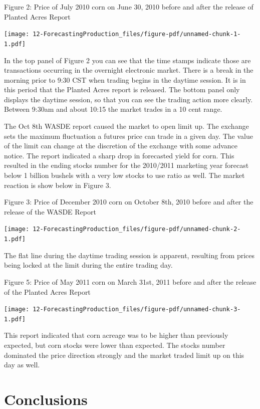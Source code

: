 \documentclass[
  letterpaper,
  DIV=11,
  numbers=noendperiod]{scrreprt}
\begin{document}
Figure 2: Price of July 2010 corn on June 30, 2010 before and after the
release of Planted Acres Report

\texttt{[image: 12-ForecastingProduction\_files/figure-pdf/unnamed-chunk-1-1.pdf]}

In the top panel of Figure 2 you can see that the time stamps indicate
those are transactions occurring in the overnight electronic market.
There is a break in the morning prior to 9:30 CST when trading begins in
the daytime session. It is in this period that the Planted Acres report
is released. The bottom panel only displays the daytime session, so that
you can see the trading action more clearly. Between 9:30am and about
10:15 the market trades in a 10 cent range.

The Oct 8th WASDE report caused the market to open limit up. The
exchange sets the maximum fluctuation a futures price can trade in a
given day. The value of the limit can change at the discretion of the
exchange with some advance notice. The report indicated a sharp drop in
forecasted yield for corn. This resulted in the ending stocks number for
the 2010/2011 marketing year forecast below 1 billion bushels with a
very low stocks to use ratio as well. The market reaction is show below
in Figure 3.

Figure 3: Price of December 2010 corn on October 8th, 2010 before and
after the release of the WASDE Report

\texttt{[image: 12-ForecastingProduction\_files/figure-pdf/unnamed-chunk-2-1.pdf]}

The flat line during the daytime trading session is apparent, resulting
from prices being locked at the limit during the entire trading day.

Figure 5: Price of May 2011 corn on March 31st, 2011 before and after
the release of the Planted Acres Report

\texttt{[image: 12-ForecastingProduction\_files/figure-pdf/unnamed-chunk-3-1.pdf]}

This report indicated that corn acreage was to be higher than previously
expected, but corn stocks were lower than expected. The stocks number
dominated the price direction strongly and the market traded limit up on
this day as well.

\hypertarget{conclusions-1}{%
\section{Conclusions}\label{conclusions-1}}
\end{document}
